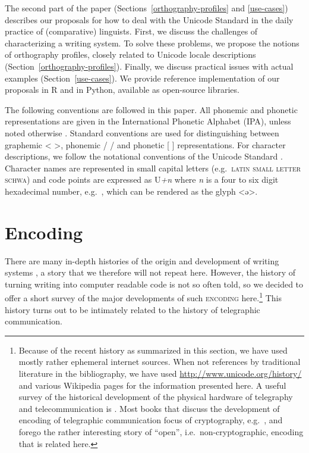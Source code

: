 The second part of the paper (Sections~\ref{orthography-profiles} and
\ref{use-cases}) describes our proposals for how to deal with the Unicode
Standard in the daily practice of (comparative) linguists. First, we discuss the
challenges of characterizing a writing system. To solve these problems, we
propose the notions of orthography profiles, closely related to Unicode locale
descriptions (Section~\ref{orthography-profiles}). Finally, we discuss practical
issues with actual examples (Section~\ref{use-cases}). We provide reference
implementation of our proposals in R and in Python, available as open-source
libraries.

The following conventions are followed in this paper. All phonemic and phonetic
representations are given in the International Phonetic Alphabet (IPA), unless
noted otherwise \citep{IPA2005}. Standard conventions are used for
distinguishing between graphemic < >, phonemic / / and phonetic [ ]
representations. For character descriptions, we follow the notational
conventions of the Unicode Standard \citep{Unicode2014}. Character names are
represented in small capital letters (e.g.~\textsc{latin small letter schwa})
and code points are expressed as U\emph{+n} where \emph{n} is a four to six
digit hexadecimal number, e.g.~, which can be rendered as the glyph <ə>.

\section{Encoding}
\label{encoding}

There are many in-depth histories of the origin and development of writing
systems \citep[e.g.~][]{Robinson1995,Powell2012}, a story that we therefore will
not repeat here. However, the history of turning writing into computer readable
code is not so often told, so we decided to offer a short survey of the major
developments of such \textsc{encoding} here.\footnote{Because of the recent
history as summarized in this section, we have used mostly rather ephemeral
internet sources. When not references by traditional literature in the
bibliography, we have used \url{http://www.unicode.org/history/} and various
Wikipedia pages for the information presented here. A useful survey of the
historical development of the physical hardware of telegraphy and
telecommunication is \citet{Huurdeman2003}. Most books that discuss the
development of encoding of telegraphic communication focus of cryptography,
e.g.~\citet{Singh1999}, and forego the rather interesting story of ``open'',
i.e.~non-cryptographic, encoding that is related here.} This history turns out
to be intimately related to the history of telegraphic communication.

